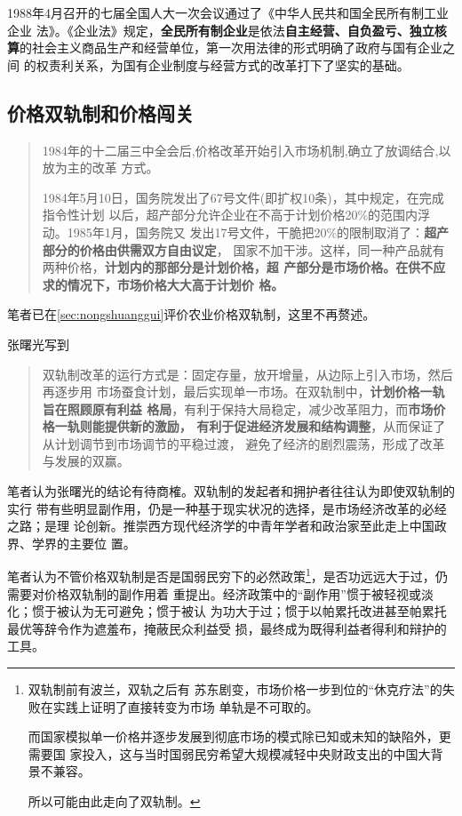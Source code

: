 1988年4月召开的七届全国人大一次会议通过了《中华人民共和国全民所有制工业企业
法》。《企业法》规定，\textbf{全民所有制企业}是依法\textbf{自主经营、自负盈亏、独立核
  算}的社会主义商品生产和经营单位，第一次用法律的形式明确了政府与国有企业之间
的权责利关系，为国有企业制度与经营方式的改革打下了坚实的基础。


\subsection{价格双轨制和价格闯关}
\label{sec:qishuanggui}

\begin{quotation}
  1984年的十二届三中全会后,价格改革开始引入市场机制,确立了放调结合,以放为主的改革
  方式。\cite{wangqiangshehui}

  1984年5月10日，国务院发出了67号文件(即扩权10条)，其中规定，在完成指令性计划
  以后，超产部分允许企业在不高于计划价格20\%的范围内浮动。1985年1月，国务院又
  发出17号文件，干脆把20\%的限制取消了：\textbf{超产部分的价格由供需双方自由议定}，
  国家不加干涉。这样，同一种产品就有两种价格，\textbf{计划内的那部分是计划价格，超
    产部分是市场价格。在供不应求的情况下，市场价格大大高于计划价
    格。}\cite{yangshuanggui}
\end{quotation}

笔者已在\cref{sec:nongshuanggui}评价农业价格双轨制，这里不再赘述。

张曙光写到
\begin{quotation}
  双轨制改革的运行方式是：固定存量，放开增量，从边际上引入市场，然后再逐步用
  市场蚕食计划，最后实现单一市场。在双轨制中，\textbf{计划价格一轨旨在照顾原有利益
    格局}，有利于保持大局稳定，减少改革阻力，而\textbf{市场价格一轨则能提供新的激励，
    有利于促进经济发展和结构调整}，从而保证了从计划调节到市场调节的平稳过渡，
  避免了经济的剧烈震荡，形成了改革与发展的双赢。
\end{quotation}

笔者认为张曙光的结论有待商榷。双轨制的发起者和拥护者往往认为即使双轨制的实行
带有些明显副作用，仍是一种基于现实状况的选择，是市场经济改革的必经之路；是理
论创新。推崇西方现代经济学的中青年学者和政治家至此走上中国政界、学界的主要位
置。

笔者认为不管价格双轨制是否是国弱民穷下的必然政策\footnote{双轨制前有波兰，双轨之后有
  苏东剧变，市场价格一步到位的“休克疗法”的失败在实践上证明了直接转变为市场
  单轨是不可取的。

  而国家模拟单一价格并逐步发展到彻底市场的模式除已知或未知的缺陷外，更需要国
  家投入，这与当时国弱民穷希望大规模减轻中央财政支出的中国大背景不兼容。

  所以可能由此走向了双轨制。}，是否功远远大于过，仍需要对价格双轨制的副作用着
重提出。经济政策中的“副作用”惯于被轻视或淡化；惯于被认为无可避免；惯于被认
为功大于过；惯于以帕累托改进甚至帕累托最优等辞令作为遮羞布，掩蔽民众利益受
损，最终成为既得利益者得利和辩护的工具。

